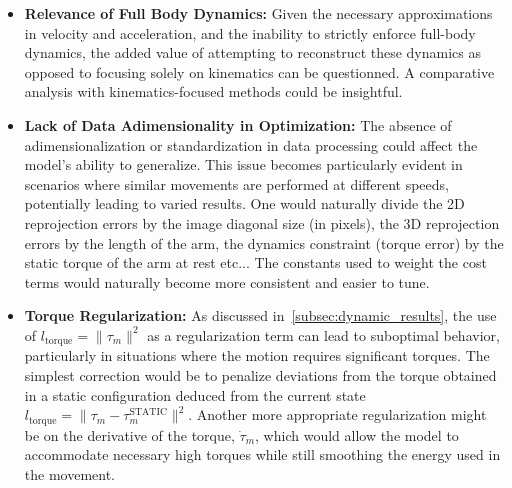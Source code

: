 \begin{itemize}
    \item \textbf{Relevance of Full Body Dynamics:} Given the necessary approximations in velocity and acceleration, and the inability to 
    strictly enforce full-body dynamics, the added value of attempting to reconstruct these dynamics as opposed to focusing 
    solely on kinematics can be questionned. A comparative analysis with kinematics-focused methods could be insightful.

    \item \textbf{Lack of Data Adimensionality in Optimization:} The absence of adimensionalization or standardization in data processing could 
    affect the model's ability to generalize. This issue becomes particularly evident in scenarios where similar movements are performed at 
    different speeds, potentially leading to varied results.
    One would naturally divide the 2D reprojection errors by the image diagonal size (in pixels), the 3D reprojection errors by the length of the arm,
    the dynamics constraint (torque error) by the static torque of the arm at rest etc... 
    The constants used to weight the cost terms would naturally become more consistent and easier to tune.

    \item \textbf{Torque Regularization:} As discussed in~\cref{subsec:dynamic_results}, the use 
    of \(l_{\text{torque}} = \|\tau_m\|^2\) as a regularization term can lead to suboptimal 
    behavior, particularly in situations where the motion requires significant torques. 
    The simplest correction would be to penalize deviations from the torque obtained in a static configuration deduced from the current state \(l_{\text{torque}} = \|\tau_m - \tau_m^{\textrm{STATIC}} \|^2\).
    Another more appropriate regularization might be on the derivative of the torque, \(\dot{\tau}_m\), which 
    would allow the model to accommodate necessary high torques while still smoothing the energy used in the movement.

\end{itemize}